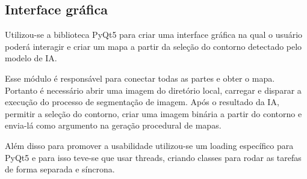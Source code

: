 

\subsection{Interface gráfica}

Utilizou-se a biblioteca PyQt5 para criar uma interface gráfica na qual o usuário poderá interagir e criar um mapa a partir da seleção do contorno detectado pelo modelo de IA.

Esse módulo é responsável para conectar todas as partes e obter o mapa. Portanto é necessário abrir uma imagem do diretório local, carregar e disparar a execução do processo de segmentação de imagem. Após o resultado da IA, permitir a seleção do contorno,  criar uma imagem binária a partir do contorno e envia-lá como argumento na geração procedural de mapas.

Além disso para promover a usabilidade utilizou-se um loading específico para PyQt5 e para isso teve-se que usar threads, criando classes para rodar as tarefas de forma separada e síncrona.